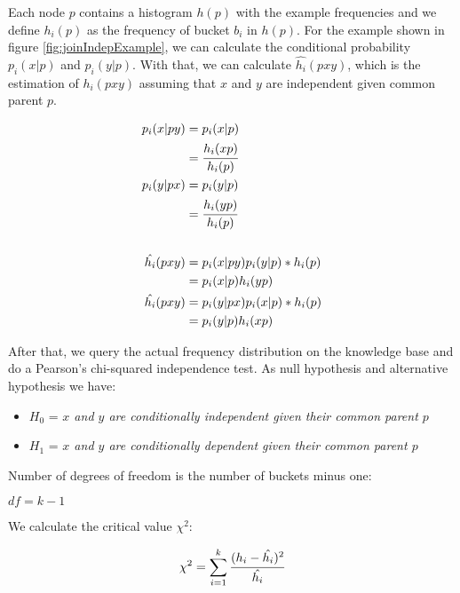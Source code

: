 Each node $p$ contains a histogram $h(p)$ with the example frequencies and we define $h_i(p)$ as the frequency of bucket
$b_i$ in $h(p)$. For the example shown in figure \ref{fig:joinIndepExample}, we can calculate the conditional
probability $p_i(x|p)$ and $p_i(y|p)$. With that, we can calculate $\hat{h_i}(p x y)$, which is the estimation of
$h_i(p x y)$ assuming that $x$ and $y$ are independent given common parent $p$.

\begin{equation}
\label{eq:condindep}
\begin{split}
 p_i(x|py) &= p_i(x|p) \\ 
 &= \cfrac{h_i(xp)}{h_i(p)} \\ 
 p_i(y|px) &= p_i(y|p) \\ 
 &= \cfrac{h_i(yp)}{h_i(p)} \\ \\ 
 \hat{h_i}(pxy) &= p_i(x|py)p_i(y|p)*h_i(p) \\ 
 &= p_i(x|p)h_i(yp) \\ 
 \hat{h_i}(pxy) &= p_i(y|px)p_i(x|p)*h_i(p) \\ 
 &= p_i(y|p)h_i(xp)
\end{split}
\end{equation}

After that, we query the actual frequency distribution on the knowledge base and do a Pearson's chi-squared
independence test. As null hypothesis and alternative hypothesis we have:

\begin{itemize}
 \item $H_0$ = \emph{$x$ and $y$ are conditionally independent given their common parent $p$}
 \item $H_1$ = \emph{$x$ and $y$ are conditionally dependent given their common parent $p$} 
\end{itemize}

Number of degrees of freedom is the number of buckets minus one:

\begin{center}
 $df=k-1$
\end{center}

We calculate the critical value $\chi^2$:

\begin{equation}
 \chi^2=\sum_{i=1}^{k} \cfrac{(h_i - \hat{h_i})^2}{\hat{h_i}}
\end{equation}

\cite{Jaroszewicz02pruningredundant}

